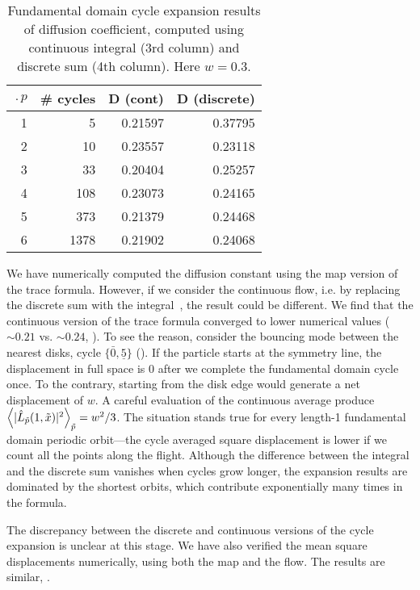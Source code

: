 \begin{table}[htbp]
	\centering
	\begin{tabular}{|r|r|r|r||}
		\hline
		$\period{p}$ & \# cycles & D (cont) & D (discrete) \\
		\hline\hline
		1      & 5      & 0.21597 & 0.37795 \\
		2      & 10     & 0.23557 & 0.23118 \\
		3      & 33     & 0.20404 & 0.25257 \\
		4      & 108    & 0.23073 & 0.24165 \\
		5      & 373    & 0.21379 & 0.24468 \\
		6      & 1378   & 0.21902 & 0.24068 \\
		\hline
	\end{tabular}
	\caption[Fundamental domain cycle expansion results of diffusion
	coefficient]{\label{TCELL3}
		Fundamental domain cycle expansion results of diffusion
		coefficient, computed using continuous integral (3rd column)
		and discrete sum (4th column). Here $w = 0.3$.
	}
\end{table}

We have numerically computed the diffusion constant using the map
version of the trace formula. However, if we consider the continuous
flow, i.e. by replacing the discrete sum with the
integral~, the result could be different. We find
that the continuous version of the trace formula
converged to lower numerical values ($\sim0.21$ vs. $\sim0.24$,
).
To see the
reason, consider the bouncing mode between the nearest disks, cycle
$\{{\bar{0}, \underline{5}}\}$ (). If the
particle starts at the symmetry line,
the displacement in full space is $0$ after we complete the
fundamental domain cycle once. To the contrary, starting from the
disk edge would generate a net displacement of $w$. A careful
evaluation of the continuous average produce
$\left\langle\vert\hat{L}_{{\tilde p}}(1,\tilde x)\vert^2\right\rangle_{{\tilde p}} =
w^2/3$. The situation stands true for every
length-1 fundamental domain periodic orbit---the cycle averaged
square displacement is lower if we count all the points along the
flight. Although the difference between the integral and the discrete
sum vanishes when cycles grow longer, the expansion results are
dominated by the shortest orbits, which contribute exponentially many
times in the formula.

The discrepancy between
the discrete and continuous versions of the cycle expansion is
unclear at this stage. We have also verified the mean square
displacements numerically, using both the map and the flow. The
results are similar, .

